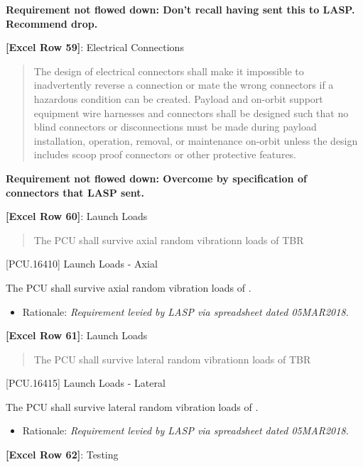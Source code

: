 \textbf{Requirement not flowed down: Don’t recall having sent this to LASP. Recommend drop.}

\textbf{[Excel Row 59]}: Electrical Connections

\begin{quote}
The design of electrical connectors shall make it impossible to inadvertently reverse a connection or mate the wrong connectors if a hazardous condition can be created. Payload and on-orbit support equipment wire harnesses and connectors shall be designed such that no blind connectors or disconnections must be made during payload installation, operation, removal, or maintenance on-orbit unless the design includes scoop proof connectors or other protective features.
\end{quote}

\textbf{Requirement not flowed down: Overcome by specification of connectors that LASP sent.}

\textbf{[Excel Row 60]}: Launch Loads

\begin{quote}
The PCU shall survive axial random vibrationn loads of TBR
\end{quote}

[PCU.16410] Launch Loads - Axial

The PCU shall survive axial random vibration loads of .

\begin{itemize}
\item{} Rationale: \emph{Requirement levied by LASP via spreadsheet dated 05MAR2018.}

\end{itemize}

\textbf{[Excel Row 61]}: Launch Loads

\begin{quote}
The PCU shall survive lateral random vibrationn loads of TBR
\end{quote}

[PCU.16415] Launch Loads - Lateral

The PCU shall survive lateral random vibration loads of .

\begin{itemize}
\item{} Rationale: \emph{Requirement levied by LASP via spreadsheet dated 05MAR2018.}

\end{itemize}

\textbf{[Excel Row 62]}: Testing

